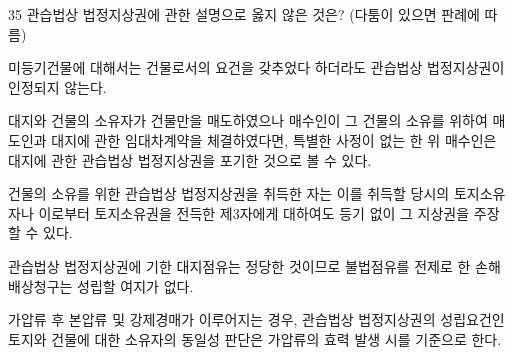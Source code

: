 \begin{question}{35}
관습법상 법정지상권에 관한 설명으로 옳지 않은 것은? (다툼이 있으면 판례에 따름)
\begin{choices}
  \item 미등기건물에 대해서는 건물로서의 요건을 갖추었다 하더라도 관습법상 법정지상권이 인정되지 않는다.
  \item 대지와 건물의 소유자가 건물만을 매도하였으나 매수인이 그 건물의 소유를 위하여 매도인과 대지에 관한 임대차계약을 체결하였다면, 특별한 사정이 없는 한 위 매수인은 대지에 관한 관습법상 법정지상권을 포기한 것으로 볼 수 있다.
  \item 건물의 소유를 위한 관습법상 법정지상권을 취득한 자는 이를 취득할 당시의 토지소유자나 이로부터 토지소유권을 전득한 제3자에게 대하여도 등기 없이 그 지상권을 주장할 수 있다.
  \item 관습법상 법정지상권에 기한 대지점유는 정당한 것이므로 불법점유를 전제로 한 손해배상청구는 성립할 여지가 없다.
  \item 가압류 후 본압류 및 강제경매가 이루어지는 경우, 관습법상 법정지상권의 성립요건인 토지와 건물에 대한 소유자의 동일성 판단은 가압류의 효력 발생 시를 기준으로 한다.
\end{choices}
\end{question}
